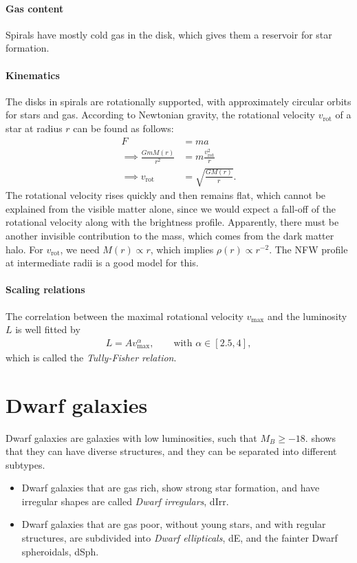 \paragraph{Gas content}
Spirals have mostly cold gas in the disk, which gives them a reservoir for star formation.

\paragraph*{Kinematics}
The disks in spirals are rotationally supported, with approximately circular orbits for stars and gas.
According to Newtonian gravity, the rotational velocity $v_\text{rot}$ of a star at radius $r$ can be found as follows:
\begin{align*}
	F &= ma\\
	\implies \frac{G m M(r)}{r^2} &= m \frac{v_\text{rot}^2}{r}\\
	\implies v_\text{rot} &= \sqrt{\frac{G M(r)}{r}}.
\end{align*}
The rotational velocity rises quickly and then remains flat, which cannot be explained from the visible matter alone, since we would expect a fall-off of the rotational velocity along with the brightness profile.
Apparently, there must be another invisible contribution to the mass, which comes from the dark matter halo.
For $v_\text{rot}$, we need $M(r) \propto r$, which implies $\rho(r) \propto r^{-2}$.
The NFW profile at intermediate radii is a good model for this.

\paragraph*{Scaling relations}
The correlation between the maximal rotational velocity $v_\text{max}$ and the luminosity $L$ is well fitted by
\begin{align*}
	L = A v_\text{max}^\alpha, 
	\qquad \text{with } \alpha \in [2.5, 4],
\end{align*}
which is called the \emph{Tully-Fisher relation}.




\section{Dwarf galaxies}
Dwarf galaxies are galaxies with low luminosities, such that $M_B \geq - 18$.
 shows that they can have diverse structures, and they can be separated into different subtypes.
\begin{itemize}
	\item Dwarf galaxies that are gas rich, show strong star formation, and have irregular shapes are called \emph{Dwarf irregulars}, dIrr.
	\item Dwarf galaxies that are gas poor, without young stars, and with regular structures, are subdivided into \emph{Dwarf ellipticals}, dE, and the fainter Dwarf spheroidals, dSph.
\end{itemize}


